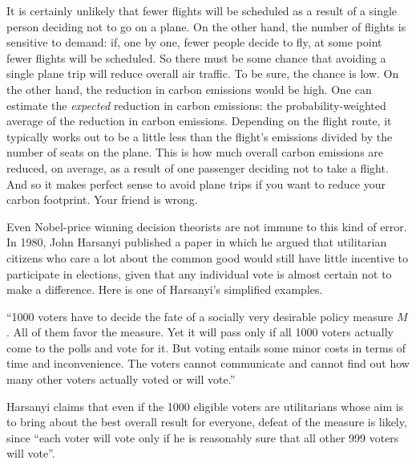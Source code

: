 It is certainly unlikely that fewer flights will be scheduled as a
result of a single person deciding not to go on a plane. On the other
hand, the number of flights is sensitive to demand: if, one by one,
fewer people decide to fly, at some point fewer flights will be
scheduled. So there must be some chance that avoiding a single plane
trip will reduce overall air traffic. To be sure, the chance is low.
On the other hand, the reduction in carbon emissions would be high. One
can estimate the \emph{expected} reduction in carbon emissions: the
probability-weighted average of the reduction in carbon emissions.
Depending on the flight route, it typically works out to be a little
less than the flight's emissions divided by the number of seats on the
plane. This is how much overall carbon emissions are reduced, on
average, as a result of one passenger deciding not to take a flight.
And so it makes perfect sense to avoid plane trips if you want to
reduce your carbon footprint. Your friend is wrong.

Even Nobel-price winning decision theorists are not immune to this
kind of error. In 1980, John Harsanyi published a paper in which he
argued that utilitarian citizens who care a lot about the common good
would still have little incentive to participate in elections, given
that any individual vote is almost certain not to make a difference.
Here is one of Harsanyi's simplified examples.

\begin{example}
  ``1000 voters have to decide the fate of a socially very desirable
  policy measure $M$. All of them favor the measure. Yet it will pass
  only if all 1000 voters actually come to the polls and vote for
  it. But voting entails some minor costs in terms of time and
  inconvenience. The voters cannot communicate and cannot find out how
  many other voters actually voted or will vote.''
\end{example}

Harsanyi claims that even if the 1000 eligible voters are utilitarians
whose aim is to bring about the best overall result for everyone,
defeat of the measure is likely, since ``each voter will vote only if
he is reasonably sure that all other 999 voters will vote''.

